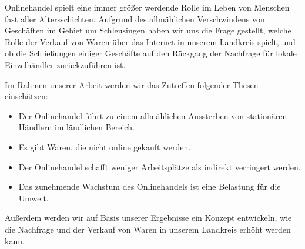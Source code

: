 



Onlinehandel spielt eine immer größer werdende Rolle im Leben von Menschen fast aller Altersschichten. Aufgrund des allmählichen Verschwindens von Geschäften im Gebiet um Schleusingen haben wir uns die Frage gestellt, welche Rolle der Verkauf von Waren über das Internet in unserem Landkreis spielt, und ob die Schließungen einiger Geschäfte auf den Rückgang der Nachfrage für lokale Einzelhändler zurückzuführen ist.

Im Rahmen unserer Arbeit werden wir das Zutreffen folgender Thesen einschätzen:
\begin{itemize}
    \item Der Onlinehandel führt zu einem allmählichen Aussterben von stationären Händlern im ländlichen Bereich.
    
    \item Es gibt Waren, die nicht online gekauft werden.

    \item Der Onlinehandel schafft weniger Arbeitsplätze als indirekt verringert werden.
    
    \item Das zunehmende Wachstum des Onlinehandels ist eine Belastung für die Umwelt.
\end{itemize}

Außerdem werden wir auf Basis unserer Ergebnisse ein Konzept entwickeln, wie die Nachfrage und der Verkauf von Waren in unserem Landkreis erhöht werden kann.
